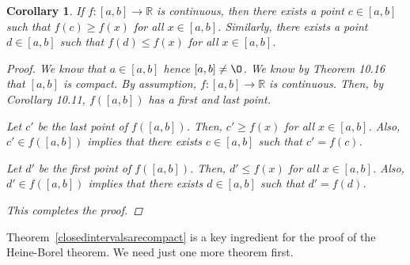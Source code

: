 \documentclass[11pt]{article}
\newcommand{\bbR}{\mathbb{R}}
\renewcommand{\emptyset}{\O}
\providecommand{\arr}{\longrightarrow}
\renewcommand{\_}[1]{\underline{ #1 }}
\newtheorem{corollary}[theorem]{Corollary}
\theoremstyle{definition}
\numberwithin{equation}{subsection}
\begin{document}
\begin{corollary} If $f \colon [a,b] \arr \bbR$ is continuous, then there exists a point $c \in [a, b]$ such that $f(c) \geq f(x)$ for all $x \in [a, b]$.  Similarly, there exists a point $d \in [a, b]$ such that $f(d) \leq f(x)$ for all $x \in [a, b]$.


\begin{proof}
We know that $a \in [a,b]$ hence $[a,b] \neq \emptyset$. We know by Theorem 10.16 that $[a,b]$ is compact. By assumption, $f: [a,b] \rightarrow \bbR$ is continuous. Then, by Corollary 10.11, $f([a,b])$ has a first and last point.

Let $c'$ be the last point of $f([a,b])$. Then, $c' \geq f(x)$ for all $x \in [a,b]$. Also, $c' \in f([a,b])$ implies that there exists $c \in [a,b]$ such that $c'=f(c)$.  

Let $d'$ be the first point of $f([a,b])$. Then, $d' \leq f(x)$ for all $x \in [a,b]$. Also, $d' \in f([a,b])$ implies that there exists $d \in [a,b]$ such that $d'=f(d)$.

This completes the proof.

\renewcommand\qedsymbol{QED}
\end{proof}


\end{corollary}

Theorem~\ref{closedintervalsarecompact} is a key ingredient for the proof of the Heine-Borel theorem. We need just one more theorem first.
\end{document}
